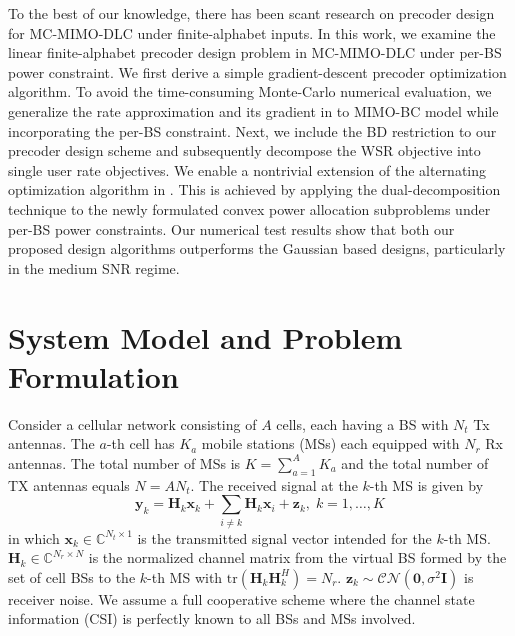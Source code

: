 \documentclass{article}
\begin{document}
To the best of our knowledge, there has been scant research on precoder design for MC-MIMO-DLC under finite-alphabet inputs.
In this work, we examine the linear finite-alphabet precoder design problem in MC-MIMO-DLC under per-BS power constraint.
We first derive a simple gradient-descent precoder optimization algorithm. To avoid the time-consuming Monte-Carlo numerical evaluation,
we generalize the rate approximation and its gradient in \cite{zeng2012low} to MIMO-BC model \cite{wu2012linear} while incorporating the per-BS constraint.
Next, we include the BD restriction to our precoder design scheme and subsequently decompose the WSR objective into single user rate objectives.
We enable a nontrivial extension of the alternating optimization algorithm in \cite{xiao2011globally}. This is achieved by applying the dual-decomposition technique \cite{zhang2010cooperative, palomar2006tutorial} to the newly formulated convex power allocation subproblems under per-BS power constraints.
Our numerical test results show that both our proposed design algorithms outperforms the Gaussian based designs,
particularly in the medium SNR regime.
\vspace*{-3mm}

\section{System Model and Problem Formulation}
\label{sec:mode}
\vspace*{-2mm}


Consider a cellular network consisting of $A$ cells, each having a BS with $N_t$ Tx antennas.
The $a$-th cell has $K_a$ mobile stations (MSs) each equipped with $N_r$ Rx antennas.
The total number of MSs is $K = \sum_{a=1}^AK_a$ and the total number of TX antennas equals $N=AN_t$.
The received signal at the $k$-th MS is given by
\begin{equation}
    \label{eq:channel}
    \mathbf{y}_k = \mathbf{H}_k\mathbf{x}_k+\sum_{i\not=k}\mathbf{H}_k\mathbf{x}_i+\mathbf{z}_k,\;k=1,\ldots,K
\end{equation}
in which $\mathbf{x}_k\in\mathbb{C}^{N_t\times1}$ is the transmitted signal vector intended for the $k$-th MS.
$\mathbf{H}_k\in\mathbb{C}^{N_r\times N}$ is the normalized channel matrix from the virtual BS formed by the set of
cell BSs to the $k$-th MS with $\mbox{tr}\left(\mathbf{H}_k\mathbf{H}_k^H\right)=N_r$. $\mathbf{z}_k\sim\mathcal{CN}(\mathbf{0},\sigma^2\mathbf{I})$ is receiver
noise. We assume a full cooperative scheme where the channel state information (CSI) is perfectly known to all BSs and MSs involved.
\end{document}
